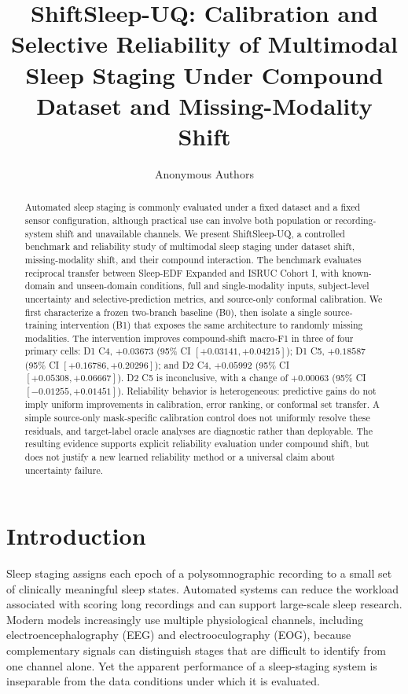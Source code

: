 \documentclass[10pt,twocolumn]{article}
\title{ShiftSleep-UQ: Calibration and Selective Reliability of Multimodal Sleep Staging Under Compound Dataset and Missing-Modality Shift}
\author{Anonymous Authors}
\date{}
\begin{document}
\maketitle

\begin{abstract}
Automated sleep staging is commonly evaluated under a fixed dataset and a fixed sensor configuration, although practical use can involve both population or recording-system shift and unavailable channels. We present ShiftSleep-UQ, a controlled benchmark and reliability study of multimodal sleep staging under dataset shift, missing-modality shift, and their compound interaction. The benchmark evaluates reciprocal transfer between Sleep-EDF Expanded and ISRUC Cohort I, with known-domain and unseen-domain conditions, full and single-modality inputs, subject-level uncertainty and selective-prediction metrics, and source-only conformal calibration. We first characterize a frozen two-branch baseline (B0), then isolate a single source-training intervention (B1) that exposes the same architecture to randomly missing modalities. The intervention improves compound-shift macro-F1 in three of four primary cells: D1 C4, $+0.03673$ (95\% CI $[+0.03141,+0.04215]$); D1 C5, $+0.18587$ (95\% CI $[+0.16786,+0.20296]$); and D2 C4, $+0.05992$ (95\% CI $[+0.05308,+0.06667]$). D2 C5 is inconclusive, with a change of $+0.00063$ (95\% CI $[-0.01255,+0.01451]$). Reliability behavior is heterogeneous: predictive gains do not imply uniform improvements in calibration, error ranking, or conformal set transfer. A simple source-only mask-specific calibration control does not uniformly resolve these residuals, and target-label oracle analyses are diagnostic rather than deployable. The resulting evidence supports explicit reliability evaluation under compound shift, but does not justify a new learned reliability method or a universal claim about uncertainty failure.
\end{abstract}

\section{Introduction}
Sleep staging assigns each epoch of a polysomnographic recording to a small set of clinically meaningful sleep states. Automated systems can reduce the workload associated with scoring long recordings and can support large-scale sleep research. Modern models increasingly use multiple physiological channels, including electroencephalography (EEG) and electrooculography (EOG), because complementary signals can distinguish stages that are difficult to identify from one channel alone. Yet the apparent performance of a sleep-staging system is inseparable from the data conditions under which it is evaluated.
\end{document}
